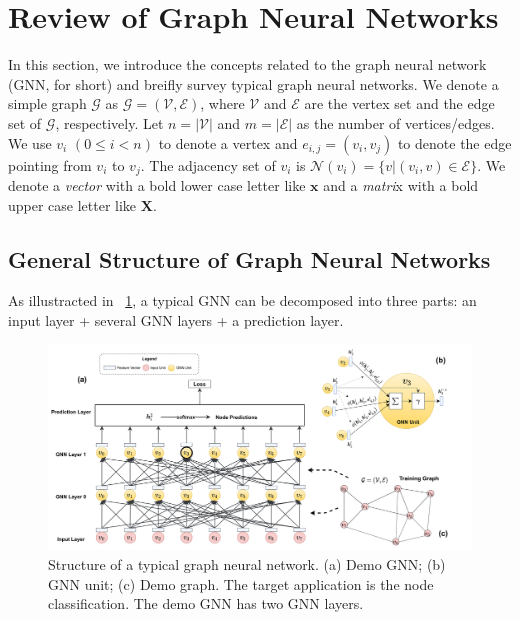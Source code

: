 \section{Review of Graph Neural Networks}

In this section, we introduce the concepts related to the graph neural network (GNN, for short) and breifly survey typical graph neural networks.
We denote a simple graph $\mathcal{G}$ as $\mathcal{G}=(\mathcal{V}, \mathcal{E})$, where $\mathcal{V}$ and $\mathcal{E}$ are the vertex set and the edge set of $\mathcal{G}$, respectively.
Let $n=|\mathcal{V}|$ and $m=|\mathcal{E}|$ as the number of vertices/edges. 
We use $v_i$ $(0 \leq i < n)$ to denote a vertex and $e_{i,j}=(v_i, v_j)$ to denote the edge pointing from $v_i$ to $v_j$.
The adjacency set of $v_i$ is $\mathcal{N}(v_i)=\{v|(v_i, v) \in \mathcal{E}\}$.
We denote a \emph{vector} with a bold lower case letter like $\boldsymbol{x}$ and a \emph{matri}x with a bold upper case letter like $\boldsymbol{X}$.

\subsection{General Structure of Graph Neural Networks}

As illustracted in \figurename~\ref{fig:general_structure_of_gnn}, a typical GNN can be decomposed into three parts: an input layer + several GNN layers + a prediction layer.

\begin{figure}
	\centering
	\includegraphics[width=0.95\columnwidth]{figs/illustration/GNN_common_architecture.png}
	\caption{Structure of a typical graph neural network. (a) Demo GNN; (b) GNN unit; (c) Demo graph. The target application is the node classification. The demo GNN has two GNN layers.}
	\label{fig:general_structure_of_gnn}
\end{figure}

